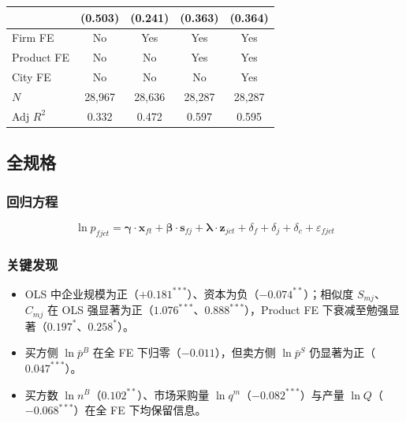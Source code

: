 \documentclass[12pt]{article}
\newcommand{\se}[1]{{\small(#1)}}
\begin{document}
\begin{table}[H]
\begin{threeparttable}
\begin{tabular}{lcccc}
                           & \se{0.503} & \se{0.241}      & \se{0.363}       & \se{0.364}       \\
      \midrule
      Firm FE              & No  & Yes & Yes & Yes \\
      Product FE           & No  & No  & Yes & Yes \\
      City FE              & No  & No  & No  & Yes \\
      $N$                  & 28,967 & 28,636 & 28,287 & 28,287 \\
      Adj $R^2$            & 0.332  & 0.472  & 0.597  & 0.595  \\
      \bottomrule
    \end{tabular}
  \end{threeparttable}
\end{table}



\subsection{全规格}

\subsubsection*{回归方程}

\begin{equation}
  \ln p_{fjct} = \boldsymbol{\gamma} \cdot \mathbf{x}_{ft}
    + \boldsymbol{\beta} \cdot \mathbf{s}_{fj}
    + \boldsymbol{\lambda} \cdot \mathbf{z}_{jct}
    + \delta_f + \delta_j + \delta_c + \varepsilon_{fjct}
\end{equation}

\subsubsection*{关键发现}

\begin{itemize}[nosep]
  \item OLS 中企业规模为正（$+0.181^{***}$）、资本为负（$-0.074^{**}$）；相似度 $S_{mj}$、$C_{mj}$ 在 OLS 强显著为正（$1.076^{***}$、$0.888^{***}$），Product FE 下衰减至勉强显著（$0.197^{*}$、$0.258^{*}$）。
  \item 买方侧 $\ln\bar{p}^{B}$ 在全 FE 下归零（$-0.011$），但卖方侧 $\ln\bar{p}^{S}$ 仍显著为正（$0.047^{***}$）。
  \item 买方数 $\ln n^B$（$0.102^{**}$）、市场采购量 $\ln q^m$（$-0.082^{***}$）与产量 $\ln Q$（$-0.068^{***}$）在全 FE 下均保留信息。
\end{itemize}
\end{document}
